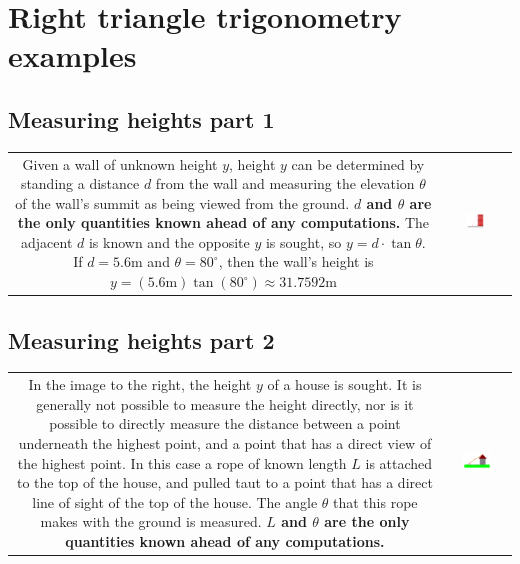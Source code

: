 \documentclass{article}
\begin{document}
\section{Right triangle trigonometry examples}


\subsection*{Measuring heights part 1}

\begin{tabular}{cc}
\parbox{0.6\textwidth}{
Given a wall of unknown height \(y\), height \(y\) can be determined by standing a distance \(d\) from the wall and measuring the elevation \(\theta\) of the wall's summit as being viewed from the ground. {\bf \(d\) and \(\theta\) are the only quantities known ahead of any computations.} The adjacent \(d\) is known and the opposite \(y\) is sought, so \(y = d \cdot \tan\theta\). \\
If \(d = 5.6\text{m}\) and \(\theta = 80^\circ\), then the wall's height is \(y = (5.6\text{m})\tan(80^\circ) \approx 31.7592\text{m}\)
} & \parbox{0.3\textwidth}{
\includegraphics[width = 0.3\textwidth]{wall_height_v2}
}
\end{tabular}



\subsection*{Measuring heights part 2}

\begin{tabular}{cc}
\parbox{0.5\textwidth}{
In the image to the right, the height \(y\) of a house is sought. It is generally not possible to measure the height directly, nor is it possible to directly measure the distance between a point underneath the highest point, and a point that has a direct view of the highest point. In this case a rope of known length \(L\) is attached to the top of the house, and pulled taut to a point that has a direct line of sight of the top of the house. The angle \(\theta\) that this rope makes with the ground is measured. {\bf \(L\) and \(\theta\) are the only quantities known ahead of any computations.}
} & \parbox{0.5\textwidth}{
\includegraphics[width = 0.5\textwidth]{house_height}
}
\end{tabular}
\end{document}
